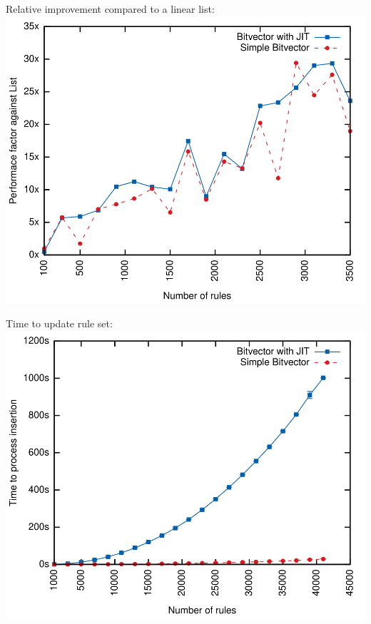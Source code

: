 \documentclass[xcolor=x11names,compress]{beamer}
\renewcommand{\(}{\begin{columns}}
\renewcommand{\)}{\end{columns}}
\newcommand{\<}[1]{\begin{column}{#1}}
\renewcommand{\>}{\end{column}}
\begin{document}
\begin{frame}
  Relative improvement compared to a linear list:
  \includegraphics[height=0.9\textheight]{figures/eval_w_relative}
\end{frame}

\begin{frame}
  Time to update rule set:
  \includegraphics[height=0.9\textheight]{figures/eval_time}
\end{frame}
\end{document}
